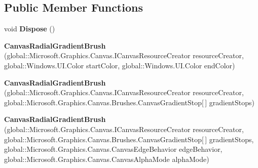 \subsection*{Public Member Functions}
\begin{DoxyCompactItemize}
\item 
\mbox{\label{class_microsoft_1_1_graphics_1_1_canvas_1_1_brushes_1_1_canvas_radial_gradient_brush_a7aea17ea64376e07a9c103770bcdbe55}} 
void {\bfseries Dispose} ()
\item 
\mbox{\label{class_microsoft_1_1_graphics_1_1_canvas_1_1_brushes_1_1_canvas_radial_gradient_brush_a63863bff18c4d0e79ecfc400e0f0752f}} 
{\bfseries Canvas\+Radial\+Gradient\+Brush} (global\+::\+Microsoft.\+Graphics.\+Canvas.\+I\+Canvas\+Resource\+Creator resource\+Creator, global\+::\+Windows.\+U\+I.\+Color start\+Color, global\+::\+Windows.\+U\+I.\+Color end\+Color)
\item 
\mbox{\label{class_microsoft_1_1_graphics_1_1_canvas_1_1_brushes_1_1_canvas_radial_gradient_brush_aa2c2fd59d76619f8d908b988059d5e2c}} 
{\bfseries Canvas\+Radial\+Gradient\+Brush} (global\+::\+Microsoft.\+Graphics.\+Canvas.\+I\+Canvas\+Resource\+Creator resource\+Creator, global\+::\+Microsoft.\+Graphics.\+Canvas.\+Brushes.\+Canvas\+Gradient\+Stop\mbox{[}$\,$\mbox{]} gradient\+Stops)
\item 
\mbox{\label{class_microsoft_1_1_graphics_1_1_canvas_1_1_brushes_1_1_canvas_radial_gradient_brush_a72a997087b68baa682963acf4c7547b0}} 
{\bfseries Canvas\+Radial\+Gradient\+Brush} (global\+::\+Microsoft.\+Graphics.\+Canvas.\+I\+Canvas\+Resource\+Creator resource\+Creator, global\+::\+Microsoft.\+Graphics.\+Canvas.\+Brushes.\+Canvas\+Gradient\+Stop\mbox{[}$\,$\mbox{]} gradient\+Stops, global\+::\+Microsoft.\+Graphics.\+Canvas.\+Canvas\+Edge\+Behavior edge\+Behavior, global\+::\+Microsoft.\+Graphics.\+Canvas.\+Canvas\+Alpha\+Mode alpha\+Mode)
\item 
\mbox{\label{class_microsoft_1_1_graphics_1_1_canvas_1_1_brushes_1_1_canvas_radial_gradient_brush_a5bcd11137c2799ca1ee5edea427d5ecb}} 

\end{DoxyCompactItemize}
